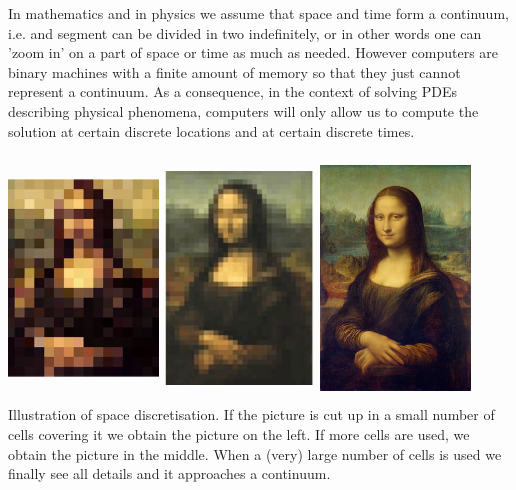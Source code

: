 
In mathematics and in physics we assume that space and time form a continuum, i.e.
and segment can be divided in two indefinitely, or in other words one can 'zoom in'
on a part of space or time as much as needed. 
However computers are binary machines with a finite amount of memory so that they 
just cannot represent a continuum. As a consequence, in the context of solving PDEs
describing physical phenomena, computers will only allow us to compute the solution 
at certain discrete locations and at certain discrete times. 

\begin{center}
\includegraphics[width=4cm,height=6.5cm]{images/discrete/monalisa1.jpg}
\includegraphics[width=4cm,height=6.5cm]{images/discrete/monalisa2.jpg}
\includegraphics[width=4cm,height=6.5cm]{images/discrete/monalisa3.jpg}\\
{\captionfont Illustration of space discretisation. If the picture is cut up 
in a small number of cells covering it we obtain the picture on the left.
If more cells are used, we obtain the picture in the middle. When a (very) large
number of cells is used we finally see all details and it approaches a continuum.}
\end{center}


